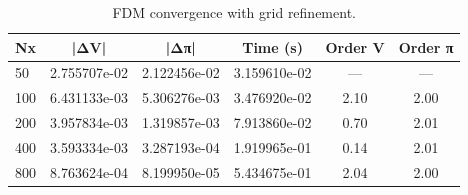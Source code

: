 \begin{table}[ht]
\centering
\caption{FDM convergence with grid refinement.}
\label{tab:convergence_fdm}
\begin{tabular}{lccccc}
\toprule
Nx & |ΔV| & |Δπ| & Time (s) & Order V & Order π \\
\midrule
50 & 2.755707e-02 & 2.122456e-02 & 3.159610e-02 & — & — \\
100 & 6.431133e-03 & 5.306276e-03 & 3.476920e-02 & 2.10 & 2.00 \\
200 & 3.957834e-03 & 1.319857e-03 & 7.913860e-02 & 0.70 & 2.01 \\
400 & 3.593334e-03 & 3.287193e-04 & 1.919965e-01 & 0.14 & 2.01 \\
800 & 8.763624e-04 & 8.199950e-05 & 5.434675e-01 & 2.04 & 2.00 \\
\bottomrule
\end{tabular}
\end{table}